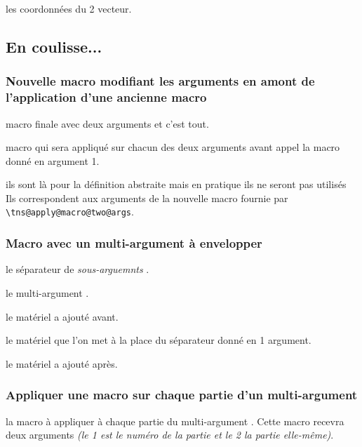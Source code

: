 \documentclass[12pt,a4paper]{article}
\newcommand\env[1]{\texttt{#1}}
\newcommand\macro[1]{\env{\textbackslash{}#1}}
\theoremstyle{definition}
\begin{document}
{{{{{{{{{{{ les coordonnées du 2\ieme{} vecteur.


\subsection{En coulisse...}

\subsubsection{Nouvelle macro modifiant les arguments en amont de l'application d'une ancienne macro}




 macro finale avec deux arguments et c'est tout.

 macro qui sera appliqué sur chacun des deux arguments avant appel la macro donné en argument 1.

 ils sont là pour la définition abstraite mais en pratique ils ne seront pas utilisés
Ils correspondent aux arguments de la nouvelle macro fournie par \macro{tns@apply@macro@two@args}.


\subsubsection{Macro avec un \og multi-argument \fg{} à \og envelopper \fg}




 le séparateur de \emph{\og sous-arguemnts \fg}.

 le \og multi-argument \fg.

 le matériel a ajouté avant.

 le matériel que l'on met à la place du séparateur donné en 1\ier{} argument.

 le matériel a ajouté après.


\subsubsection{Appliquer une macro sur chaque partie d'un \og multi-argument \fg}




 la macro à appliquer à chaque partie du \og multi-argument \fg.
          Cette macro recevra deux arguments \emph{(le 1\ier{} est le numéro de la partie et le 2\ieme{} la partie elle-même)}.

}}}}}}}}}}}
\end{document}
